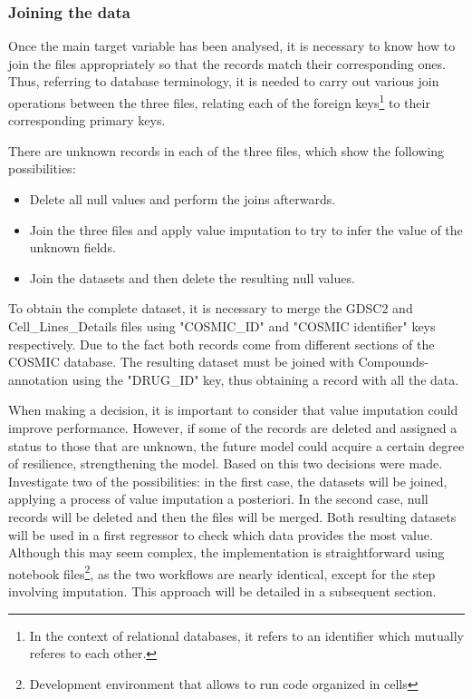 \subsubsection{Joining the data}

Once the main target variable has been analysed, it is necessary to know how to join the files appropriately so that the records match their corresponding ones. Thus, referring to database terminology, it is needed to carry out various join operations between the three files, relating each of the foreign keys\footnote{In the context of relational databases, it refers to an identifier which mutually referes to each other.} to their corresponding primary keys.

There are unknown records in each of the three files, which show the following possibilities:
\begin{itemize}
    \item Delete all null values and perform the joins afterwards.
    \item Join the three files and apply value imputation to try to infer the value of the unknown fields.
    \item Join the datasets and then delete the resulting null values.
\end{itemize}

To obtain the complete dataset, it is necessary to merge the GDSC2 and Cell\_Lines\_Details files using  "COSMIC\_ID" and "COSMIC identifier" keys respectively. Due to the fact both records come from different sections of the COSMIC database. The resulting dataset must be joined with Compounds-annotation using the "DRUG\_ID" key, thus obtaining a record with all the data.

When making a decision, it is important to consider that value imputation could improve performance. However, if some of the records are deleted and assigned a status to those that are unknown, the future model could acquire a certain degree of resilience, strengthening the model. Based on this two decisions were made. Investigate two of the possibilities: in the first case, the datasets will be joined, applying a process of value imputation a posteriori. In the second case, null records will be deleted and then the files will be merged. Both resulting datasets will be used in a first regressor to check which data provides the most value. Although this may seem complex, the implementation is straightforward using notebook files\footnote{Development environment that allows to run code organized in cells}, as the two workflows are nearly identical, except for the step involving imputation. This approach will be detailed in a subsequent section.

